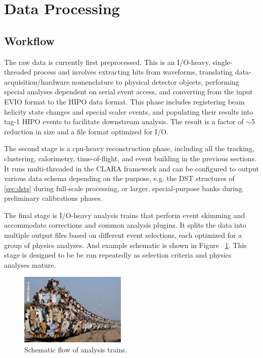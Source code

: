 \section{Data Processing}

\subsection{Workflow}
The raw data is currently first preprocessed.  This is an I/O-heavy, single-threaded process and involves extracting hits from waveforms, translating data-acquisition/hardware nomenclature to physical detector objects, performing special analyses dependent on serial event access, and converting from the input EVIO format to the HIPO data format.  This phase includes registering beam helicity state changes and special scaler events, and populating their results into tag-1 HIPO events to facilitate downstream analysis.  The result is a factor of $\sim$5 reduction in size and a file format optimized for I/O.

The second stage is a cpu-heavy reconstruction phase, including all the tracking, clustering, calorimetry, time-of-flight, and event building in the previous sections.  It runs multi-threaded in the CLARA framework and can be configured to output various data schema depending on the purpose, e.g. the DST structures of \ref{sec:dsts} during full-scale processing, or larger, special-purpose banks during preliminary calibrations phases.

The final stage is I/O-heavy analysis trains that perform event skimming and accommodate corrections and common analysis plugins.  It splits the data into multiple output files based on different event selections, each optimized for a group of physics analyses.  And example schematic is shown in Figure ~\ref{fig:train}.  This stage is designed to be be run repeatedly as selection criteria and physics analyses mature.
\begin{figure}
    \includegraphics[width=0.45\textwidth,height=0.2\textheight]{pics/train.jpg}
    \caption{Schematic flow of analysis trains.\label{fig:train}}
\end{figure}

